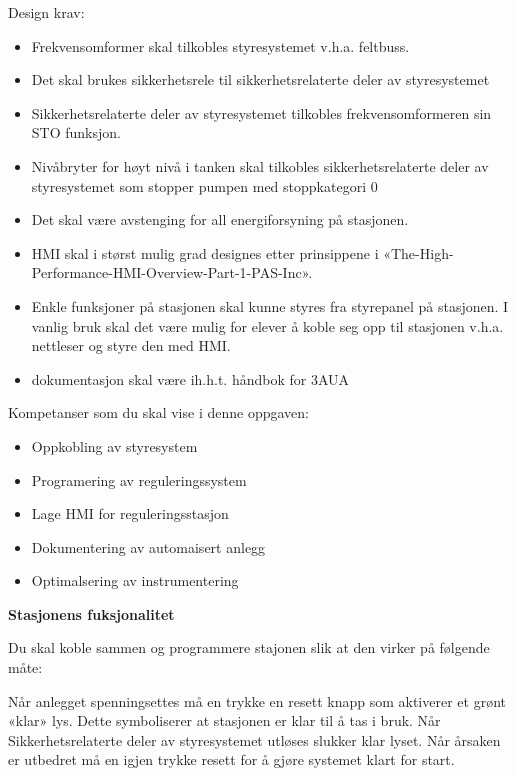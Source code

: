  

Design krav:  
\begin{itemize}[noitemsep]
	\item Frekvensomformer skal tilkobles styresystemet v.h.a. feltbuss. 
	\item Det skal brukes sikkerhetsrele til sikkerhetsrelaterte deler av styresystemet
	\item Sikkerhetsrelaterte deler av styresystemet tilkobles frekvensomformeren sin STO funksjon.  
	\item Nivåbryter for høyt nivå i tanken skal tilkobles sikkerhetsrelaterte deler av styresystemet som stopper pumpen med stoppkategori 0
	\item Det skal være avstenging for all energiforsyning på stasjonen.  
	\item HMI skal i størst mulig grad designes etter prinsippene i «The-High-Performance-HMI-Overview-Part-1-PAS-Inc».  
	\item Enkle funksjoner på stasjonen skal kunne styres fra styrepanel på stasjonen. I vanlig bruk skal det være mulig for elever å koble seg opp til stasjonen v.h.a. nettleser og styre den med HMI.  
	\item dokumentasjon skal være ih.h.t. håndbok for 3AUA
\end{itemize}

\vskip 5pt 
Kompetanser som du skal vise i denne oppgaven:
\begin{itemize}[noitemsep]
	\item Oppkobling av styresystem
	\item Programering av reguleringssystem
	\item Lage HMI for reguleringsstasjon
	\item Dokumentering av automaisert anlegg
	\item Optimalsering av instrumentering
\end{itemize}



\textbf{Stasjonens fuksjonalitet}

\vskip 10pt 

Du skal koble sammen og programmere stajonen slik at den virker på følgende måte:

\vskip 5pt 

Når anlegget spenningsettes må en trykke en resett knapp som aktiverer et grønt «klar» lys. Dette symboliserer at stasjonen er klar til å tas i bruk. Når Sikkerhetsrelaterte deler av styresystemet utløses slukker klar lyset. Når årsaken er utbedret må en igjen trykke resett for å gjøre systemet klart for start.  

